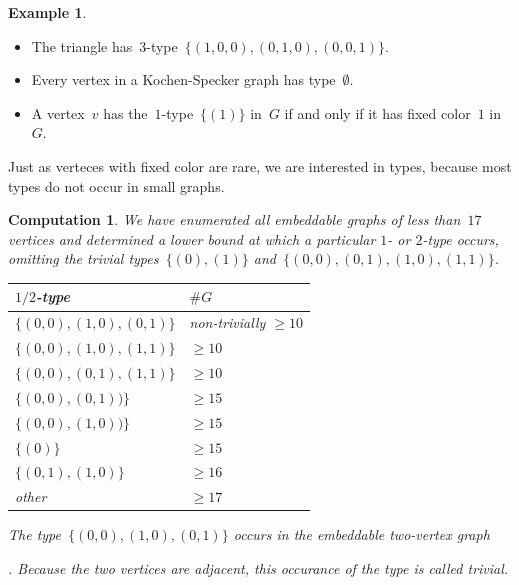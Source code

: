 \documentclass[adraft,copyright,creativecommons]{eptcs}
\newcounter{main}
\newtheorem{comp}[main]{Computation}
\theoremstyle{definition}
\newtheorem{exa}[main]{Example}
\theoremstyle{remark}
\begin{document}
\begin{exa}
\begin{itemize}
\item The triangle has~$3$-type~$\{(1,0,0), (0,1,0), (0,0,1)\}$.
\item Every vertex in a Kochen-Specker graph has type~$\emptyset$.
\item
    A vertex~$v$ has the~$1$-type~$\{(1)\}$ in~$G$ if and only if
        it has fixed color~$1$ in~$G$.
\end{itemize}
\end{exa}

Just as verteces with fixed color are rare,
we are interested in types,
because most types do not occur in small graphs.

\begin{comp}\label{comp:types}
    We have enumerated all embeddable graphs of less than~$17$ vertices
    and determined a lower bound at which a particular $1$- or $2$-type occurs,
    omitting the trivial types~$\{(0),(1)\}$
    and~$\{(0,0),(0,1),(1,0),(1,1)\}$.
    \begin{center}
    \begin{tabular}{ll}
        $1/2$-type & $\#G$ \\ \hline
        $\{(0,0), (1,0), (0,1)\}$ &
            non-trivially $\geq 10$\\ 
        $\{(0,0), (1,0), (1,1)\}$ & $\geq 10$ \\
        $\{(0,0), (0,1), (1,1)\}$ & $\geq 10$ \\
        $\{(0,0), (0,1))\}$ & $\geq 15$ \\
        $\{(0,0), (1,0))\}$ & $\geq 15$ \\
        $\{(0)\}$ & $\geq 15$ \\
        $\{(0,1),(1,0)\}$ & $\geq 16$ \\
        other & $\geq 17$
    \end{tabular}
    \end{center}
    The type~$\{(0,0),(1,0),(0,1)\}$ occurs in the embeddable two-vertex
    graph
    .
    Because the two vertices are adjacent, this occurance of
    the type is called trivial.
\end{comp}
\end{document}
